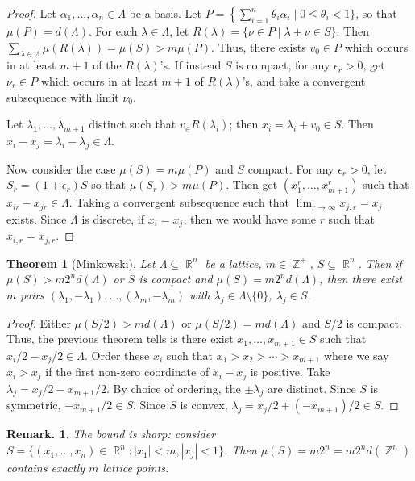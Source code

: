 \documentclass[11pt, a4paper]{memoir}
\DeclareMathOperator{\Z}{{\mathbb{Z}}}
\DeclareMathOperator{\R}{{\mathbb{R}}}
\theoremstyle{change}
\newtheorem{theorem}{Theorem}[section]
\theoremstyle{plain}
\theoremstyle{nonumberplain}
\newtheorem{remark}{Remark.}
\newtheorem{proof}{Proof}
\begin{document}
\begin{proof}
    Let $\alpha_1,\ldots,\alpha_n\in\Lambda$ be a basis.
    Let $P=\left\{\sum_{i=1}^n\theta_i\alpha_i\mid 0\leq\theta_i<1\}$, so that $\mu(P)=d(\Lambda)$.
    For each $\lambda\in\Lambda$, let $R(\lambda)=\{\nu\in P\mid\lambda+\nu\in S\}$.
    Then $\sum_{\lambda\in\Lambda}\mu(R(\lambda))=\mu(S)>m\mu(P)$.
    Thus, there exists $v_0\in P$ which occurs in at least $m+1$ of the $R(\lambda)$'s.
    If instead $S$ is compact, for any $\epsilon_r>0$, get $\nu_r\in P$ which occurs in at least $m+1$ of $R(\lambda)$'s, and take a convergent subsequence with limit $\nu_0$.

    Let $\lambda_1,\ldots,\lambda_{m+1}$ distinct such that $v_\in R(\lambda_i)$; then $x_i=\lambda_i+v_0\in S$.
    Then $x_i-x_j=\lambda_i-\lambda_j\in\Lambda$.

    Now consider the case $\mu(S)=m\mu(P)$ and $S$ compact.
    For any $\epsilon_r>0$, let $S_r=(1+\epsilon_r)S$ so that $\mu(S_r)>m\mu(P)$.
    Then get $(x_1^r,\ldots,x_{m+1}^r)$ such that $x_{ir}-x_{jr}\in\Lambda$.
    Taking a convergent subsequence such that $\lim_{r\to\infty}x_{j,r}=x_j$ exists.
    Since $\Lambda$ is discrete, if $x_i=x_j$, then we would have some $r$ such that $x_{i,r}=x_{j,r}$.
\end{proof}
\begin{theorem}[Minkowski]
    Let $\Lambda\subseteq\R^n$ be a lattice, $m\in\Z^+$, $S\subseteq\R^n$.
    Then if $\mu(S)>m2^nd(\Lambda)$ or $S$ is compact and $\mu(S)=m2^nd(\Lambda)$, then there exist $m$ pairs $(\lambda_1,-\lambda_1),\ldots,(\lambda_m,-\lambda_m)$ with $\lambda_j\in\Lambda\setminus\{0\}$, $\lambda_j\in S$.
\end{theorem}
\begin{proof}
    Either $\mu(S/2)>md(\Lambda)$ or $\mu(S/2)=md(\Lambda)$ and $S/2$ is compact.
    Thus, the previous theorem tells is there exist $x_1,\ldots,x_{m+1}\in S$ such that $x_i/2-x_j/2\in\Lambda$.
    Order these $x_i$ such that $x_1>x_2>\cdots>x_{m+1}$ where we say $x_i>x_j$ if the first non-zero coordinate of $x_i-x_j$ is positive.
    Take $\lambda_j=x_j/2-x_{m+1}/2$.
    By choice of ordering, the $\pm\lambda_j$ are distinct.
    Since $S$ is symmetric, $-x_{m+1}/2\in S$.
    Since $S$ is convex, $\lambda_j=x_j/2+(-x_{m+1})/2\in S$.
\end{proof}
\begin{remark}
    The bound is sharp: consider $S=\{(x_1,\ldots,x_n)\in\R^n:|x_1|<m,|x_j|<1\}$.
    Then $\mu(S)=m2^n=m2^nd(\Z^n)$ contains exactly $m$ lattice points.
\end{remark}
\end{document}
